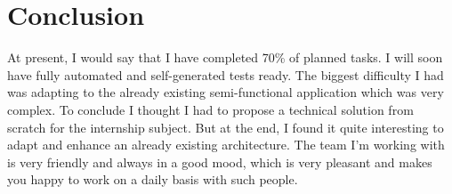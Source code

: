\section{Conclusion}
At present, I would say that I have completed 70\% of planned tasks. I will soon have
fully automated and self-generated tests ready. The biggest difficulty I had was adapting
to the already existing semi-functional application which was very complex.
To conclude I thought I had to propose a technical solution from scratch for the internship subject.
But at the end, I found it quite interesting to adapt and enhance an already existing architecture.
The team I'm working with is very friendly and always in a good mood, which is very pleasant and
makes you happy to work on a daily basis with such people.